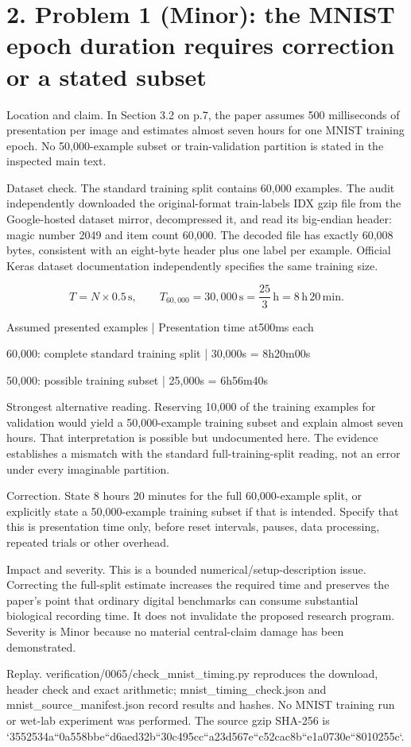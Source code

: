\documentclass[10pt]{article}
\begin{document}
\section*{2. Problem 1 (Minor): the MNIST epoch duration requires correction or a stated subset}
Location and claim. In Section 3.2 on p.7, the paper assumes 500 milliseconds of presentation per image and estimates almost seven hours for one MNIST training epoch. No 50,000-example subset or train-validation partition is stated in the inspected main text.\par
Dataset check. The standard training split contains 60,000 examples. The audit independently downloaded the original-format train-labels IDX gzip file from the Google-hosted dataset mirror, decompressed it, and read its big-endian header: magic number 2049 and item count 60,000. The decoded file has exactly 60,008 bytes, consistent with an eight-byte header plus one label per example. Official Keras dataset documentation independently specifies the same training size.\par
\[T=N\times 0.5\,\mathrm{s},\qquad
T_{60{,}000}=30{,}000\,\mathrm{s}
=\frac{25}{3}\,\mathrm{h}=8\,\mathrm{h}\,20\,\mathrm{min}.\]\par
Assumed presented examples | Presentation time at500ms each\par
60,000: complete standard training split | 30,000s = 8h20m00s\par
50,000: possible training subset | 25,000s = 6h56m40s\par
Strongest alternative reading. Reserving 10,000 of the training examples for validation would yield a 50,000-example training subset and explain almost seven hours. That interpretation is possible but undocumented here. The evidence establishes a mismatch with the standard full-training-split reading, not an error under every imaginable partition.\par
Correction. State 8 hours 20 minutes for the full 60,000-example split, or explicitly state a 50,000-example training subset if that is intended. Specify that this is presentation time only, before reset intervals, pauses, data processing, repeated trials or other overhead.\par
Impact and severity. This is a bounded numerical/setup-description issue. Correcting the full-split estimate increases the required time and preserves the paper’s point that ordinary digital benchmarks can consume substantial biological recording time. It does not invalidate the proposed research program. Severity is Minor because no material central-claim damage has been demonstrated.\par
Replay. verification/0065/check\_mnist\_timing.py reproduces the download, header check and exact arithmetic; mnist\_timing\_check.json and mnist\_source\_manifest.json record results and hashes. No MNIST training run or wet-lab experiment was performed. The source gzip SHA-256 is `3552534a``0a558bbe``d6aed32b``30c495cc``a23d567e``c52cac8b``e1a0730e``8010255c`.\par
\end{document}
